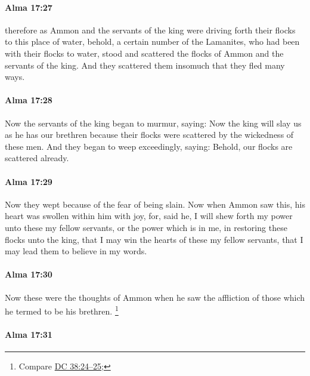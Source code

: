 		\paragraph{Alma 17:27} %
			\label{ALMA-17-27}

			therefore as Ammon and the servants of the king
			were driving forth their flocks to this place of water,
			behold, a certain number of the Lamanites,
			who had been with their flocks to water,
			stood and scattered the flocks of Ammon and the servants of the king.
			And they scattered them insomuch that they fled many ways.

		\paragraph{Alma 17:28} %
			\label{ALMA-17-28}

			Now the servants of the king began to murmur, saying:
			Now the king will slay us as he has our brethren
			because their flocks were scattered by the wickedness of these men.
			And they began to weep exceedingly, saying:
			Behold, our flocks are scattered already.

		\paragraph{Alma 17:29} %
			\label{ALMA-17-29}

			Now they wept because of the fear of being slain.
			Now when Ammon saw this, his heart was swollen within him with joy,
			for, said he, I will shew forth my power unto these my fellow servants,
			or the power which is in me,
			in restoring these flocks unto the king,
			that I may win the hearts of these my fellow servants,
			that I may lead them to believe in my words.

		\paragraph{Alma 17:30} %
			\label{ALMA-17-30}

			Now these were the thoughts of Ammon
			when he saw the affliction of those which he termed to be his brethren.%
				\footnote{%
					Compare \hyperref[DC38-24]{DC 38:24--25};
					}

		\paragraph{Alma 17:31} %
			\label{ALMA-17-31}

